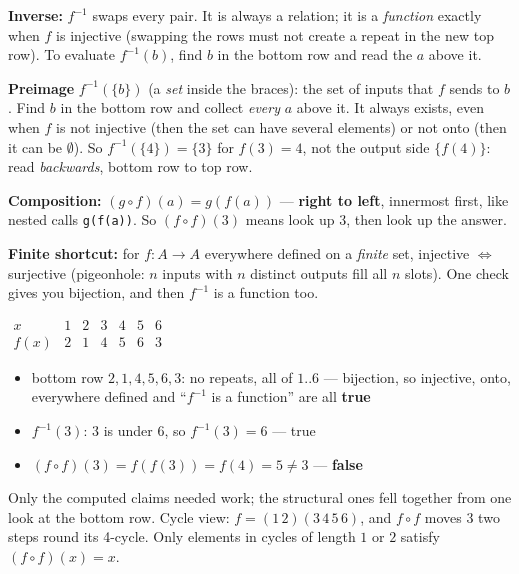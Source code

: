 \documentclass{fkt-notes}
\theoremstyle{definition}
\begin{document}
\textbf{Inverse:} $f^{-1}$ swaps every pair. It is always a relation;
it is a \emph{function} exactly when $f$ is injective (swapping the
rows must not create a repeat in the new top row). To evaluate
$f^{-1}(b)$, find $b$ in the bottom row and read the $a$ above it.

\textbf{Preimage} $f^{-1}(\{b\})$ (a \emph{set} inside the braces): the
set of inputs that $f$ sends to $b$. Find $b$ in the bottom row and collect
\emph{every} $a$ above it. It always exists, even when $f$ is not
injective (then the set can have several elements) or not onto (then it
can be $\emptyset$). So $f^{-1}(\{4\})=\{3\}$ for $f(3)=4$, not the
output side $\{f(4)\}$: read \emph{backwards}, bottom row to top row.

\textbf{Composition:} $(g \circ f)(a) = g(f(a))$ --- \textbf{right to
  left}, innermost first, like nested calls \texttt{g(f(a))}. So
$(f \circ f)(3)$ means look up $3$, then look up the answer.

\textbf{Finite shortcut:} for $f\colon A \to A$ everywhere defined on a
\emph{finite} set, injective $\iff$ surjective (pigeonhole: $n$ inputs
with $n$ distinct outputs fill all $n$ slots). One check gives you
bijection, and then $f^{-1}$ is a function too.

\begin{example}[$f = \{(1,2), (2,1), (3,4), (4,5), (5,6), (6,3)\}$ on $\{1,\dots,6\}$: which is false?]
  \leavevmode\par\noindent
  \begin{minipage}[c]{0.36\textwidth}
    \centering
    $\begin{array}{c|cccccc}
        x    & 1 & 2 & 3 & 4 & 5 & 6 \\ \hline
        f(x) & 2 & 1 & 4 & 5 & 6 & 3
      \end{array}$
  \end{minipage}\hfill
  \begin{minipage}[c]{0.6\textwidth}
    \begin{itemize}[nosep]
      \item bottom row $2,1,4,5,6,3$: no repeats, all of $1..6$ ---
            bijection, so injective, onto, everywhere defined and
            ``$f^{-1}$ is a function'' are all \textbf{true}
      \item $f^{-1}(3)$: $3$ is under $6$, so $f^{-1}(3) = 6$ --- true
      \item $(f \circ f)(3) = f(f(3)) = f(4) = 5 \ne 3$ --- \textbf{false}
    \end{itemize}
  \end{minipage}

  \smallskip\noindent
  Only the computed claims needed work; the structural ones fell
  together from one look at the bottom row. Cycle view:
  $f = (1\,2)(3\,4\,5\,6)$, and $f \circ f$ moves $3$ two steps round
  its 4-cycle. Only elements in cycles of length $1$ or $2$ satisfy
  $(f \circ f)(x) = x$.
\end{example}
\end{document}

